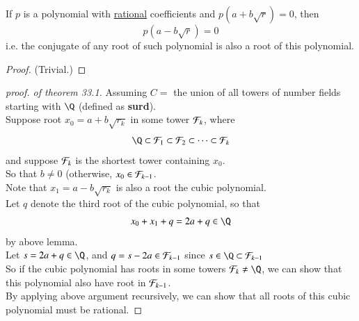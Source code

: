 \documentclass[10pt]{article}
\begin{document}
		\begin{theorem}
			If $p$ is a polynomial with \ul{rational} coefficients and $p(a + b\sqrt{r}) = 0$, then 
			\[
				p(a - b\sqrt{r}) = 0
			\]
			i.e. the conjugate of any root of such polynomial is also a root of this polynomial.
			
			\begin{proof}
				(Trivial.)
			\end{proof}
		\end{theorem}
		
		\begin{proof}[proof. of theorem 33.1]
			Assuming $C = $ the union of all towers of number fields starting with $\Q$ (defined as \textbf{surd}).\\
			Suppose root $x_0 = a + b \sqrt{r_k}$ in some tower $\mathcal{{F}}_k$, where
			\[
				\Q \subset \mc{F}_1 \subset \mc{F}_2 \subset \cdots \subset \mc{F}_k
			\]
			and suppose $\mathcal{{F}}_k$ is the shortest tower containing $x_0$. \\
			So that $b \neq 0$ (otherwise, $x_0 \in \mathcal{{F}}_{k-1}$. \\
			Note that $x_1 = a - b \sqrt{r_k}$ is also a root the cubic polynomial. \\
			Let $q$ denote the third root of the cubic polynomial, so that
			\[
				x_0 + x_1 + q = 2a + q \in \Q
			\]
			by above lemma.\\
			Let $s = 2a + q \in \Q$, and $q = s - 2a \in \mathcal{{F}}_{k-1}$ since $s \in \Q \subset \mc{F}_{k-1}$ \\
			So if the cubic polynomial has roots in some towers $\mc{F}_{k} \neq \Q$, we can show that this polynomial also have root in $\mathcal{{F}}_{k-1}$. \\
			By applying above argument recursively, we can show that all roots of this cubic polynomial must be rational.
		\end{proof}
		
\end{document}
